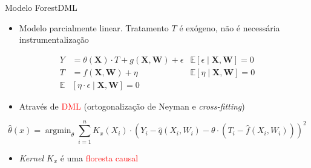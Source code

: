 \documentclass[
  12pt,
  ignorenonframetext,
  aspectratio=169]{beamer}
\providecommand{\tightlist}{%
  \setlength{\itemsep}{0pt}\setlength{\parskip}{0pt}}
\newcommand{\bfx}{\mathbf{X}}
\newcommand{\bfw}{\mathbf{W}}
\DeclareMathOperator*{\argmin}{argmin}
\begin{document}
\begin{frame}{Modelo ForestDML}
\protect\hypertarget{modelo-forestdml}{}
\begin{itemize}
\tightlist
\item
  Modelo parcialmente linear. Tratamento \(T\) é exógeno, não é
  necessária instrumentalização
\end{itemize}

\vspace{-1em}

\begin{align*}
    Y&=\theta(\bfx) \cdot T+g(\bfx, \bfw)+\epsilon  &\mathbb{E}[\epsilon \mid \bfx, \bfw]=0 \\
    T&=f(\bfx, \bfw)+\eta &\mathbb{E}[\eta \mid \bfx, \bfw]=0 \\
    \mathbb{E}&[\eta \cdot \epsilon \mid \bfx, \bfw]=0
\end{align*}

\begin{itemize}
\tightlist
\item
  Através de \textcolor{red}{DML} (ortogonalização de Neyman e
  \emph{cross-fitting})
\end{itemize}

\vspace{-1em}

\begin{equation*}
\hat{\theta}(x)=\argmin_{\theta} \sum_{i=1}^{n} K_{x}\left(X_{i}\right) \cdot\left(Y_{i}-\hat{q}\left(X_{i}, W_{i}\right)-\theta \cdot\left(T_{i}-\hat{f}\left(X_{i}, W_{i}\right)\right)\right)^{2}
\end{equation*}

\begin{itemize}
\tightlist
\item
  \emph{Kernel} \(K_x\) é uma \textcolor{red}{floresta causal}
\end{itemize}
\end{frame}
\end{document}
